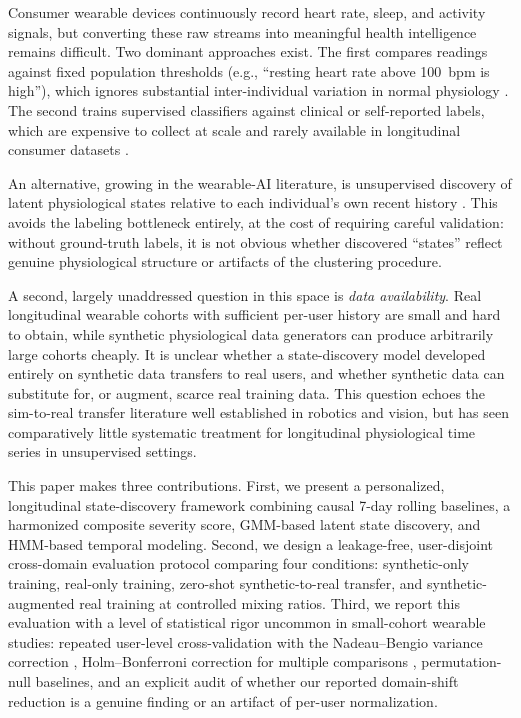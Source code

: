 \documentclass[conference]{IEEEtran}
\begin{document}
Consumer wearable devices continuously record heart rate, sleep, and activity signals, but converting these raw streams into meaningful health intelligence remains difficult. Two dominant approaches exist. The first compares readings against fixed population thresholds (e.g., ``resting heart rate above 100~bpm is high''), which ignores substantial inter-individual variation in normal physiology \cite{b6,b8}. The second trains supervised classifiers against clinical or self-reported labels, which are expensive to collect at scale and rarely available in longitudinal consumer datasets \cite{b3,b4}.

An alternative, growing in the wearable-AI literature, is unsupervised discovery of latent physiological states relative to each individual's own recent history \cite{b1,b5}. This avoids the labeling bottleneck entirely, at the cost of requiring careful validation: without ground-truth labels, it is not obvious whether discovered ``states'' reflect genuine physiological structure or artifacts of the clustering procedure.

A second, largely unaddressed question in this space is \emph{data availability}. Real longitudinal wearable cohorts with sufficient per-user history are small and hard to obtain, while synthetic physiological data generators can produce arbitrarily large cohorts cheaply. It is unclear whether a state-discovery model developed entirely on synthetic data transfers to real users, and whether synthetic data can substitute for, or augment, scarce real training data. This question echoes the sim-to-real transfer literature well established in robotics and vision, but has seen comparatively little systematic treatment for longitudinal physiological time series in unsupervised settings.

This paper makes three contributions. First, we present a personalized, longitudinal state-discovery framework combining causal 7-day rolling baselines, a harmonized composite severity score, GMM-based latent state discovery, and HMM-based temporal modeling. Second, we design a leakage-free, user-disjoint cross-domain evaluation protocol comparing four conditions: synthetic-only training, real-only training, zero-shot synthetic-to-real transfer, and synthetic-augmented real training at controlled mixing ratios. Third, we report this evaluation with a level of statistical rigor uncommon in small-cohort wearable studies: repeated user-level cross-validation with the Nadeau--Bengio variance correction \cite{b19}, Holm--Bonferroni correction for multiple comparisons \cite{b22}, permutation-null baselines, and an explicit audit of whether our reported domain-shift reduction is a genuine finding or an artifact of per-user normalization.
\end{document}

